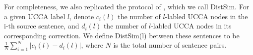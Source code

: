 \documentclass[letter,11pt]{article}
\begin{document}
For completeness, we also replicated the protocol of ,
which we call {\sc DistSim}.
For a given UCCA label $l$, denote $c_i(l)$ the number of $l$-labled UCCA nodes
in the i-th source sentence, and $d_i(l)$ the number of $l$-labled UCCA nodes
in its corresponding correction. We define {\sc DistSim}(l) between these
sentences to be $\frac{1}{N}\sum_{i=1}^N \vert c_i(l) - d_i(l) \vert$, where
$N$ is the total number of sentence pairs.




\end{document}

